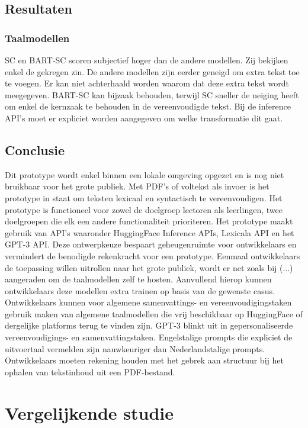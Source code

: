 \section{Resultaten}

\subsection{Taalmodellen}

SC en BART-SC scoren subjectief hoger dan de andere modellen. Zij bekijken enkel de gekregen zin. De andere modellen zijn eerder geneigd om extra tekst toe te voegen. Er kan niet achterhaald worden waarom dat deze extra tekst wordt meegegeven.
BART-SC kan bijzaak behouden, terwijl SC sneller de neiging heeft om enkel de kernzaak te behouden in de vereenvoudigde tekst. Bij de inference API's moet er expliciet worden aangegeven om welke  transformatie dit gaat. 


\section{Conclusie}

Dit prototype wordt enkel binnen een lokale omgeving opgezet en is nog niet bruikbaar voor het grote publiek. Met PDF's of voltekst als invoer is het prototype in staat om teksten lexicaal en syntactisch te vereenvoudigen. Het prototype is functioneel voor zowel de doelgroep lectoren als leerlingen, twee doelgroepen die elk een andere functionaliteit prioriteren. Het prototype maakt gebruik van API's waaronder HuggingFace Inference APIs, Lexicala API en het GPT-3 API. Deze ontwerpkeuze bespaart geheugenruimte voor ontwikkelaars en vermindert de benodigde rekenkracht voor een prototype. Eenmaal ontwikkelaars de toepassing willen uitrollen naar het grote publiek, wordt er net zoals bij (...) aangeraden om de taalmodellen zelf te hosten. Aanvullend hierop kunnen ontwikkelaars deze modellen extra trainen op basis van de gewenste casus. Ontwikkelaars kunnen voor algemene samenvattings- en vereenvoudigingstaken gebruik maken van algemene taalmodellen die vrij beschikbaar op HuggingFace of dergelijke platforms terug te vinden zijn. GPT-3 blinkt uit in gepersonaliseerde vereenvoudigings- en samenvattingstaken. Engelstalige prompts die expliciet de uitvoertaal vermelden zijn nauwkeuriger dan Nederlandstalige prompts. Ontwikkelaars moeten rekening houden met het gebrek aan structuur bij het ophalen van tekstinhoud uit een PDF-bestand.


\chapter{Vergelijkende studie}


